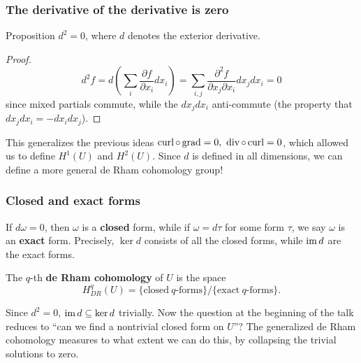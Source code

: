 \documentclass[xcolor=dvipsnames]{beamer}
\begin{document}
\begin{frame}
    \frametitle{The derivative of the derivative is zero} 
    \begin{block}{Proposition} 
       $d^2=0$, where $d$ denotes the exterior derivative. 
    \end{block}\pause
    \begin{proof}
        \[
            d^2 f= d\left( \sum _i \frac{\partial f}{\partial x_i }dx_i  \right) =\sum _{i,j}\frac{\partial ^2 f}{\partial x_j \partial x_i }dx_j dx_i =0
        \] since mixed partials commute, while the $dx_j dx_i $ anti-commute (the property that $dx_j dx_i =-dx_i dx_j $).
    \end{proof}%
    This generalizes the previous ideas $\operatorname{curl} \circ \operatorname{grad}=0,\ \operatorname{div} \circ \operatorname{curl}=0$, which allowed us to define $H^1(U)$ and $H^2(U)$. Since $d$ is defined in all dimensions, we can define a more general de Rham cohomology group!
\end{frame}

\begin{frame}
    \frametitle{Closed and exact forms} 
\begin{definition}[]
    If $d\omega=0$, then $\omega$ is a \textbf{closed} form, while if $\omega=d\tau$ for some form $\tau$, we say $\omega$ is an \textbf{exact} form.  Precisely, $\ker d$ consists of all the closed forms, while $\operatorname{im} d$ are the exact forms.
\end{definition}\pause
\begin{definition}[]
   The $q$-th \textbf{de Rham cohomology} of $U$ is the space \[
       H_{DR}^q(U)=\{\text{closed} \ q\text{-forms} \} / \{\text{exact} \ q\text{-forms} \} .
   \]  
\end{definition}
Since $d^2=0$, $\operatorname{im} d \subseteq \ker d$ trivially. Now the question at the beginning of the talk reduces to ``can we find a nontrivial closed form on $U$''? The generalized de Rham cohomology measures to what extent we can do this, by collapsing the trivial solutions to zero.
\end{frame}
\end{document}
